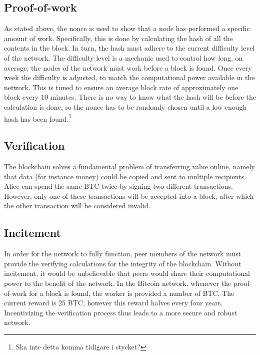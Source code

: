 \subsection{Proof-of-work}
As stated above, the nonce is used to show that a node has performed a specific amount of work. Specifically, this is done by calculating the hash of all the contents in the block. In turn, the hash must adhere to the current difficulty level of the network. The difficulty level is a mechanic used to control how long, on average, the nodes of the network must work before a block is found. Once every week the difficulty is adjusted, to match the computational power available in the network. This is tuned to ensure an average block rate of approximately one block every 10 minutes. There is no way to know what the hash will be before the calculation is done, so the nonce has to be randomly chosen until a low enough hash has been found.\footnote{Ska inte detta komma tidigare i stycket?}

\subsection{Verification}
The blockchain solves a fundamental problem of transferring value online, namely that data (for instance money) could be copied and sent to multiple recipients. Alice can spend the same BTC twice by signing two different transactions. However, only one of these transactions will be accepted into a block, after which the other transaction will be considered invalid.

\subsection{Incitement}
In order for the network to fully function, peer members of the network must provide the verifying calculations for the integrity of the blockchain. Without incitement, it would be unbelievable that peers would share their computational power to the benefit of the network. In the Bitcoin network, whenever the proof-of-work for a block is found, the worker is provided a number of BTC. The current reward is 25 BTC, however this reward halves every four years. Incentivizing the verification process thus leads to a more secure and robust network.


